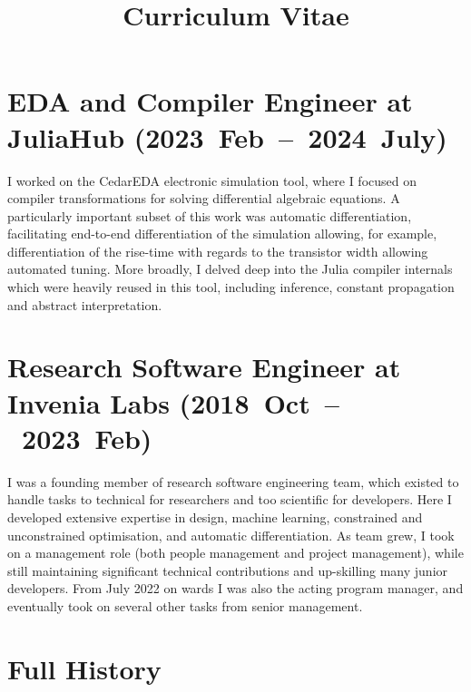 \documentclass[11pt,a4paper,sans]{moderncv}
\title{Curriculum Vitae}
\begin{document}
\makecvtitle

\section{EDA and Compiler Engineer at JuliaHub (2023~Feb~--~2024~July)}
I worked on the CedarEDA electronic simulation tool, where I focused on compiler transformations for solving differential algebraic equations.
A particularly important subset of this work was automatic differentiation, facilitating end-to-end differentiation of the simulation allowing, for example, differentiation of the rise-time with regards to the transistor width allowing automated tuning.
More broadly, I delved deep into the Julia compiler internals which were heavily reused in this tool, including inference, constant propagation and abstract interpretation.


\section {Research Software Engineer at Invenia Labs (2018~Oct~--~2023~Feb)}
I was a founding member of research software engineering team, which existed to handle tasks to technical for researchers and too scientific for developers.
Here I developed extensive expertise in design, machine learning, constrained and unconstrained optimisation, and automatic differentiation.
As team grew, I took on a management role (both people management and project management), while still maintaining significant technical contributions and up-skilling many junior developers.
From July 2022 on wards I was also the acting program manager, and eventually took on several other tasks from senior management.


\section{Full History}
\end{document}

